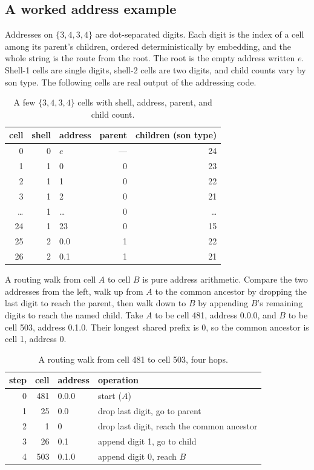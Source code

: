 \subsection{A worked address example}

Addresses on $\{3,4,3,4\}$ are dot-separated digits. Each digit is the index of a cell among its parent's children, ordered deterministically by embedding, and the whole string is the route from the root. The root is the empty address written $e$. Shell-1 cells are single digits, shell-2 cells are two digits, and child counts vary by son type. The following cells are real output of the addressing code.

\begin{table}[ht]
\centering
\begin{tabular}{@{}rrlrr@{}}
\toprule
cell & shell & address & parent & children (son type) \\
\midrule
0  & 0 & $e$   & --- & 24 \\
1  & 1 & 0   & 0 & 23 \\
2  & 1 & 1   & 0 & 22 \\
3  & 1 & 2   & 0 & 21 \\
\dots & 1 & \dots & 0 & \dots \\
24 & 1 & 23  & 0 & 15 \\
25 & 2 & 0.0 & 1 & 22 \\
26 & 2 & 0.1 & 1 & 21 \\
\bottomrule
\end{tabular}
\caption{A few $\{3,4,3,4\}$ cells with shell, address, parent, and child count.}
\end{table}

A routing walk from cell $A$ to cell $B$ is pure address arithmetic. Compare the two addresses from the left, walk up from $A$ to the common ancestor by dropping the last digit to reach the parent, then walk down to $B$ by appending $B$'s remaining digits to reach the named child. Take $A$ to be cell 481, address 0.0.0, and $B$ to be cell 503, address 0.1.0. Their longest shared prefix is 0, so the common ancestor is cell 1, address 0.

\begin{table}[ht]
\centering
\begin{tabularx}{\textwidth}{@{}rrlX@{}}
\toprule
step & cell & address & operation \\
\midrule
0 & 481 & 0.0.0 & start ($A$) \\
1 & 25  & 0.0   & drop last digit, go to parent \\
2 & 1   & 0     & drop last digit, reach the common ancestor \\
3 & 26  & 0.1   & append digit 1, go to child \\
4 & 503 & 0.1.0 & append digit 0, reach $B$ \\
\bottomrule
\end{tabularx}
\caption{A routing walk from cell 481 to cell 503, four hops.}
\end{table}


